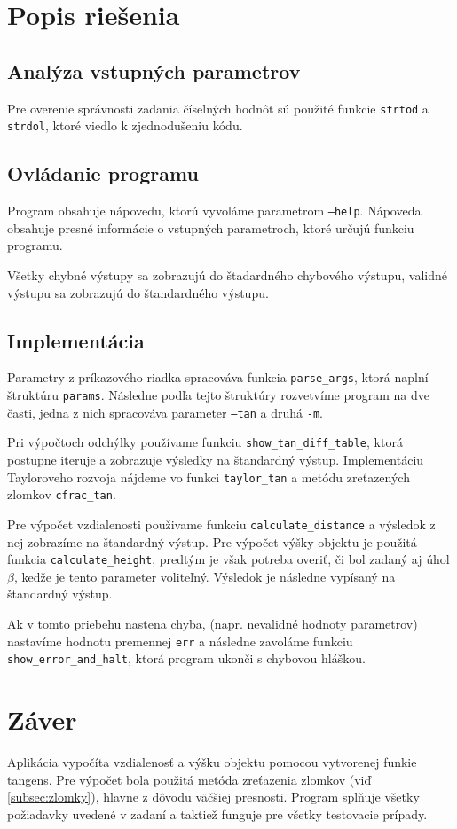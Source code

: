 \documentclass[12pt,a4paper,titlepage,final]{report}
\begin{document}
\chapter{Popis riešenia}

\section{Analýza vstupných parametrov}
Pre overenie správnosti zadania číselných hodnôt sú použité funkcie \texttt{strtod} a \texttt{strdol}, ktoré viedlo k zjednodušeniu kódu.

\section{Ovládanie programu}
Program obsahuje nápovedu, ktorú vyvoláme parametrom \texttt{--help}. Nápoveda obsahuje presné informácie o vstupných parametroch, ktoré určujú funkciu programu.

Všetky chybné výstupy sa zobrazujú do štadardného chybového výstupu, validné výstupu sa zobrazujú do štandardného výstupu.

\section{Implementácia}
Parametry z príkazového riadka spracováva funkcia \texttt{parse\_args}, ktorá naplní štruktúru \texttt{params}. Následne podľa tejto štruktúry rozvetvíme program na dve časti, jedna z nich spracováva parameter \texttt{--tan} a druhá \texttt{-m}.

Pri výpočtoch odchýlky používame funkciu \texttt{show\_tan\_diff\_table}, ktorá postupne iteruje a zobrazuje výsledky na štandardný výstup. Implementáciu Tayloroveho rozvoja nájdeme vo funkci \texttt{taylor\_tan} a metódu zreťazených zlomkov \texttt{cfrac\_tan}.

Pre výpočet vzdialenosti použivame funkciu \texttt{calculate\_distance} a výsledok z nej zobrazíme na štandardný výstup. Pre výpočet výšky objektu je použitá funkcia \texttt{calculate\_height}, predtým je však potreba overiť, či bol zadaný aj úhol $\beta$, kedže je tento parameter voliteľný. Výsledok je následne vypísaný na štandardný výstup.

Ak v tomto priebehu nastena chyba, (napr. nevalidné hodnoty parametrov) nastavíme hodnotu premennej \texttt{err} a následne zavoláme funkciu \texttt{show\_error\_and\_halt}, ktorá program ukonči s chybovou hláškou.

\chapter{Záver}
Aplikácia vypočíta vzdialenosť a výšku objektu pomocou vytvorenej funkie tangens. Pre výpočet bola použitá metóda zreťazenia zlomkov (viď \ref{subsec:zlomky}), hlavne z dôvodu väčšiej presnosti. Program splňuje všetky požiadavky uvedené v zadaní a taktiež funguje pre všetky testovacie prípady.
\end{document}
